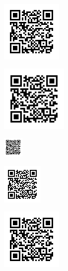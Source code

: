 \documentclass[a4]{article}
\begin{document}
 
	\pagecolor{black}
	
	\newpage
	
	
	
	\begin{figure} 
		\includegraphics{308_box_size_3_} 
		\label{fig:null_data_frame_psdos}
	\end{figure}
	
	
	\begin{figure} 
	\includegraphics[width = 3.2cm,height = 3.2cm]{308_box_size_3_} 
		\label{fig:null_data_frame_psdos}
	\end{figure}
	
	
	
	
	
	\cleardoublepage
	
	
	\begin{figure} 
		\includegraphics{308_box_size_1_} 
		\label{fig:null_data_frame_psdos}
	\end{figure}

	
\begin{figure} 
	\includegraphics{308_box_size_2_} 
	\label{fig:null_data_frame_psdos}
\end{figure}

	
\begin{figure} 
	\includegraphics{308_box_size_3_} 
	\label{fig:null_data_frame_psdos}
\end{figure}
\end{document}
